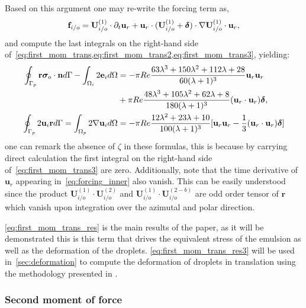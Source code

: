 Based on this argument one may re-write the forcing term as,
\begin{equation}
    \textbf{f}_{i/o}
    =\textbf{U}_{i/o}^{(1)} \cdot \pddt \textbf{u}_r 
    + \textbf{u}_r \cdot
    (\textbf{U}_{i/o}^{(1)} +\bm\delta)\cdot \grad \textbf{U}_{i/o}^{(1)}\cdot \textbf{u}_r,
    \label{eq:forcing_inner}
\end{equation}
and compute the last integrals on the right-hand side of~\ref{eq:first_mom_trans,eq:first_mom_trans2,eq:first_mom_trans3}, yielding: 
\begin{align}
    \label{eq:first_mom_trans_res}
    \intS[p]{\textbf{r}\bm\sigma_{o}\cdot \textbf{n}}
    - \intO[i]{2\textbf{e}_i}
    &= 
    -\pi Re  \frac{63 \lambda^{3} + 150 \lambda^{2} + 112 \lambda + 28}{60 (\lambda+1)^{3}} \textbf{u}_r \textbf{u}_r
    \\ \nonumber
    &+
    \pi Re  \frac{48 \lambda^{3} + 105 \lambda^2+62\lambda + 8}{180 (\lambda+1)^3} (\textbf{u}_r\cdot \textbf{u}_r) \bm\delta,
     \\
    \label{eq:first_mom_trans_res3}
    \intS[p]{2\textbf{u}_{i} \textbf{r}}
    =
    \intO[p]{2\grad\textbf{u}_{i}}
    &=
    -\pi Re \frac{12\lambda^2+23\lambda +10}{100(\lambda+1)^3}[\textbf{u}_r\textbf{u}_r-\frac{1}{3} (\textbf{u}_r\cdot \textbf{u}_r )\bm\delta]
\end{align}
one can remark the absence of $\zeta$ in these formulas, this is because by carrying direct calculation the first integral on the right-hand side of~\ref{eq:first_mom_trans3} are zero. 
Additionally, note that the time derivative of $\textbf{u}_r$ appearing in~\ref{eq:forcing_inner} also vanish. 
This can be easily understood since the product $\textbf{U}_{i/o}^{(1)}\cdot \textbf{U}_{i/o}^{(2)}$ and $\textbf{U}_{i/o}^{(1)}\cdot \textbf{U}_{i/o}^{(2-b)}$ are odd order tensor of $\textbf{r}$ which vanish upon integration over the azimutal and polar direction. 

\ref{eq:first_mom_trans_res} is the main results of the paper, as it will be demonstrated this is this term that drives the equivalent stress of the emulsion as well as the deformation of the droplets. 
\ref{eq:first_mom_trans_res3} will be used in~\ref{sec:deformation} to compute the deformation of droplets in translation using the methodology presented in \citet{fintzi2024averaged}. 

\subsubsection{Second moment of force}

